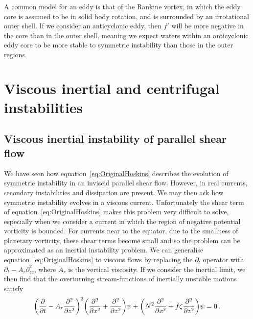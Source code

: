 A common model for an eddy is that of the Rankine vortex, in which the eddy core is assumed to be in solid body rotation, and is surrounded by an irrotational outer shell. If we consider an anticyclonic eddy, then $f'$ will be more negative in the core than in the outer shell, meaning we expect waters within an anticyclonic eddy core to be more stable to symmetric instability than those in the outer regions.





\section{Viscous inertial and centrifugal instabilities}
\label{sec:ViscousSI}
\subsection{Viscous inertial instability of parallel shear flow}
We have seen how equation~\ref{eq:OriginalHoskins} describes the evolution of symmetric instability in an inviscid parallel shear flow. However, in real currents, secondary instabilities and dissipation are present. We may then ask how symmetric instability evolves in a viscous current. Unfortunately the shear term of equation~\ref{eq:OriginalHoskins} makes this problem very difficult to solve, especially when we consider a current in which the region of negative potential vorticity is bounded. For currents near to the equator, due to the smallness of planetary vorticity, these shear terms become small and so the problem can be approximated as an inertial instability problem. We can generalise equation~\ref{eq:OriginalHoskins} to viscous flows by replacing the $\partial_t$ operator with $\partial_t - A_r \partial^2_{zz}$, where $A_r$ is the vertical viscosity. If we consider the inertial limit, we then find that the overturning stream-functions of inertially unstable motions satisfy
\begin{equation}
    \label{eq:BarotropicHoskins}
    \bigg(\pdv{}{t} - A_r \pdv[2]{}{z} \bigg)^2 \bigg(\pdv[2]{}{x} + \pdv[2]{}{z}\bigg) \psi + \bigg( N^2 \pdv[2]{}{x} + f \zeta \pdv[2]{}{z} \bigg) \psi = 0 \, .
\end{equation}


